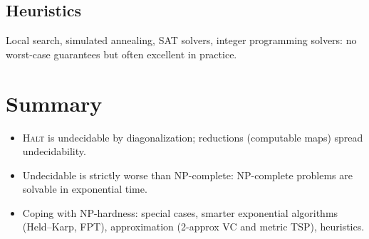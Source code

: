 \subsection{Heuristics}
Local search, simulated annealing, SAT solvers, integer programming solvers: no worst-case guarantees but often excellent in practice.

\section*{Summary}
\begin{itemize}
  \item \textsc{Halt} is undecidable by diagonalization; reductions (computable maps) spread undecidability.
  \item Undecidable is strictly worse than NP-complete: NP-complete problems are solvable in exponential time.
  \item Coping with NP-hardness: special cases, smarter exponential algorithms (Held--Karp, FPT), approximation (2-approx VC and metric TSP), heuristics.
\end{itemize}
